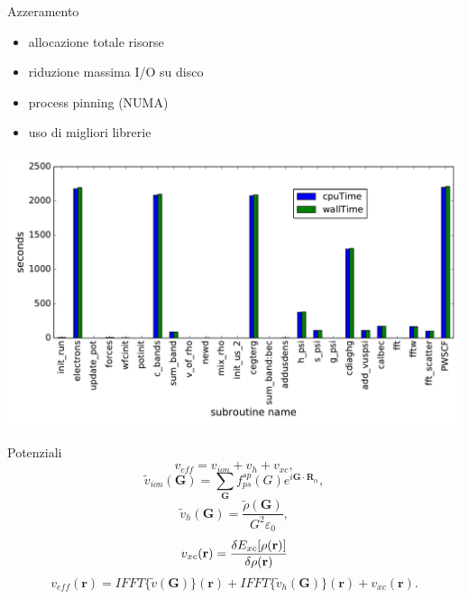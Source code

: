 \documentclass[8pt]{beamer}
\newcommand\mf[1]{\mathbf{#1}}
\newcommand\dens{\rho(\mathbf{r})}
\newcommand\erre{\mathbf{r}}
\begin{document}
\begin{frame}{Azzeramento}
\begin{itemize}
	\item allocazione totale risorse
	\item riduzione massima I/O su disco
	\item process pinning (NUMA)
	\item uso di migliori librerie
\end{itemize}
\begin{center}
	\includegraphics[height=0.5\textheight]{cpuwalltime.pdf}	
\end{center}
\end{frame}


\begin{frame}{Potenziali}
\begin{equation}
	v_{eff} = v_{ion} + v_{h} + v_{xc},
\end{equation}
\begin{equation}
	\tilde{v}_{ion}(\mf{G}) = \sum_{\mf{G}} f_{ps}^{sp}(G) e^{i \mf{G} \cdot \mf{R}_{\alpha}},
\end{equation}
\begin{equation}
	\tilde{v}_{h}(\mf{G}) = \frac{\tilde{\rho}(\mf{G})}{G^2 \varepsilon_{0}},
\end{equation}
\begin{equation}
	v_{xc}(\erre) =	\frac{\var{E_{xc}[\dens]}}{\var{\dens}}
\end{equation}
\begin{equation}
	v_{eff}(\erre) = IFFT\{\tilde{v}(\mf{G})\}(\erre) + IFFT\{\tilde{v}_{h}(\mf{G})\}(\erre) + v_{xc}(\erre).
\end{equation}


\end{frame}
\end{document}
